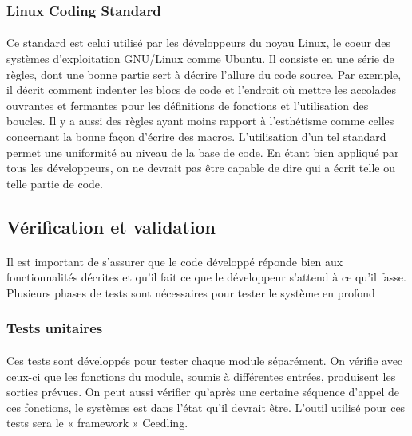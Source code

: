 		\subsubsection{Linux Coding Standard}
	
			\paragraph{}
			Ce standard est celui utilisé par les développeurs du noyau Linux, le coeur des systèmes d’exploitation GNU/Linux comme Ubuntu. Il consiste en une série de règles, dont une bonne partie sert à décrire l’allure du code source. Par exemple, il décrit comment indenter les blocs de code et l’endroit où mettre les accolades ouvrantes et fermantes pour les définitions de fonctions et l’utilisation des boucles. Il y a aussi des règles ayant moins rapport à l’esthétisme comme celles concernant la bonne façon d’écrire des macros. L’utilisation d’un tel standard permet une uniformité au niveau de la base de code. En étant bien appliqué par tous les développeurs, on ne devrait pas être capable de dire qui a écrit telle ou telle partie de code.
	
	\subsection{Vérification et validation}

		\paragraph{}
		Il est important de s’assurer que le code développé réponde bien aux fonctionnalités décrites et qu’il fait ce que le développeur s’attend à ce qu’il fasse. Plusieurs phases de tests sont nécessaires pour tester le système en profond
	
		\subsubsection{Tests unitaires}
	
			\paragraph{}
			Ces tests sont développés pour tester chaque module séparément. On vérifie avec ceux-ci que les fonctions du module, soumis à différentes entrées, produisent les sorties prévues. On peut aussi vérifier qu’après une certaine séquence d’appel de ces fonctions, le systèmes est dans l’état qu’il devrait être. L’outil utilisé pour ces tests sera le « framework » Ceedling.
		
